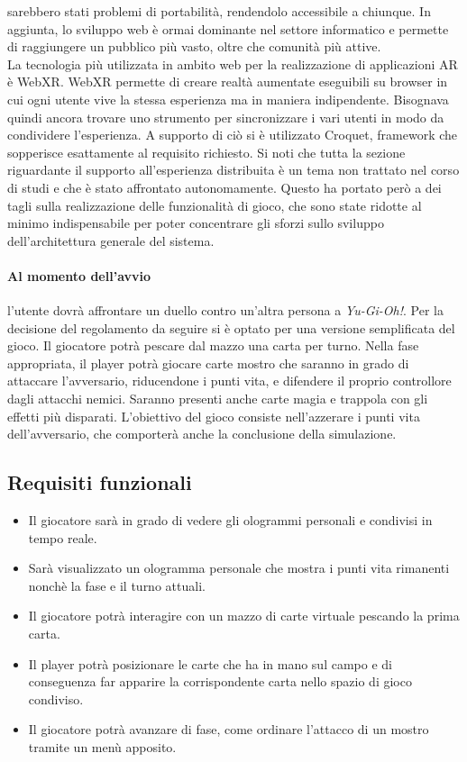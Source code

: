     sarebbero stati problemi di portabilità, rendendolo accessibile a chiunque. In aggiunta, lo sviluppo web è ormai dominante nel settore informatico e permette di raggiungere un pubblico
    più vasto, oltre che comunità più attive.\\
    La tecnologia più utilizzata in ambito web per la realizzazione di applicazioni AR è WebXR. WebXR permette di creare realtà aumentate eseguibili su browser in cui ogni utente
    vive la stessa esperienza ma in maniera indipendente. Bisognava quindi ancora trovare uno strumento per sincronizzare i vari utenti in modo da condividere l'esperienza. A supporto 
    di ciò si è utilizzato Croquet, framework che sopperisce esattamente al requisito richiesto. Si noti che tutta la sezione riguardante il supporto all'esperienza distribuita è un tema
    non trattato nel corso di studi e che è stato affrontato autonomamente. Questo ha portato però a dei tagli sulla realizzazione delle funzionalità di gioco, che sono state ridotte
    al minimo indispensabile per poter concentrare gli sforzi sullo sviluppo dell'architettura generale del sistema.\\
    \newline
    \paragraph{Al momento dell'avvio} l'utente dovrà affrontare un duello contro un'altra persona a \textit{Yu-Gi-Oh!}. Per la decisione del regolamento da seguire si è optato per
    una versione semplificata del gioco. Il giocatore potrà pescare dal mazzo una carta per turno. Nella fase appropriata, il player potrà giocare carte mostro che saranno in grado di 
    attaccare l'avversario, riducendone i punti vita, e difendere il proprio controllore dagli attacchi nemici. Saranno presenti anche carte magia e trappola con gli effetti più disparati.
    L'obiettivo del gioco consiste nell'azzerare i punti vita dell'avversario, che comporterà anche la conclusione della simulazione.

    \subsection{Requisiti funzionali}\label{subsec:requisitiFunzionali}
        \begin{itemize}
            \item Il giocatore sarà in grado di vedere gli ologrammi personali e condivisi in tempo reale.
            \item Sarà visualizzato un ologramma personale che mostra i punti vita rimanenti nonchè la fase e il turno attuali.
            \item Il giocatore potrà interagire con un mazzo di carte virtuale pescando la prima carta.
            \item Il player potrà posizionare le carte che ha in mano sul campo e di conseguenza far apparire la corrispondente carta nello spazio di gioco condiviso.
            \item Il giocatore potrà avanzare di fase, come ordinare l'attacco di un mostro tramite un menù apposito.
        \end{itemize}
